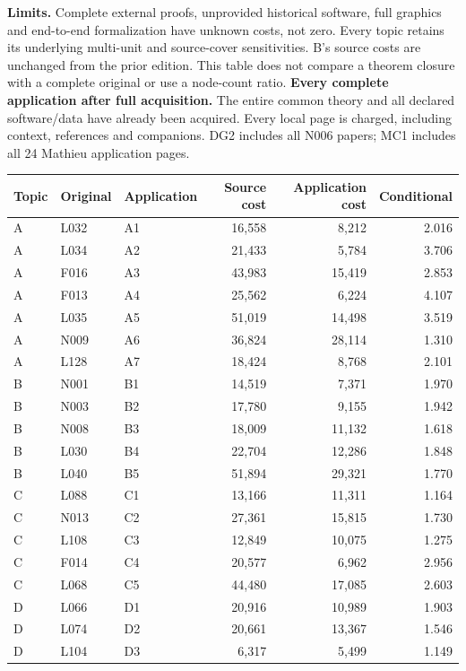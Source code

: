 \documentclass[11pt,a4paper]{article}
\newcommand{\tabsetup}{\small\setlength{\tabcolsep}{4pt}\renewcommand{\arraystretch}{1.10}}
\begin{document}
\textbf{Limits.} Complete external proofs, unprovided historical software, full graphics and end-to-end formalization have unknown costs, not zero. Every topic retains its underlying multi-unit and source-cover sensitivities. B's source costs are unchanged from the prior edition. This table does not compare a theorem closure with a complete original or use a node-count ratio.
\newpage
\textbf{Every complete application after full acquisition.}
The entire common theory and all declared software/data have already been acquired. Every local page is charged, including context, references and companions. DG2 includes all N006 papers; MC1 includes all 24 Mathieu application pages.
\begin{center}\tabsetup\renewcommand{\arraystretch}{1.03}\begin{tabular}{lllrrr}\toprule
Topic & Original & Application & Source cost & Application cost & Conditional\\\midrule
A & L032 & A1 & 16,558 & 8,212 & 2.016 \\
A & L034 & A2 & 21,433 & 5,784 & 3.706 \\
A & F016 & A3 & 43,983 & 15,419 & 2.853 \\
A & F013 & A4 & 25,562 & 6,224 & 4.107 \\
A & L035 & A5 & 51,019 & 14,498 & 3.519 \\
A & N009 & A6 & 36,824 & 28,114 & 1.310 \\
A & L128 & A7 & 18,424 & 8,768 & 2.101 \\
B & N001 & B1 & 14,519 & 7,371 & 1.970 \\
B & N003 & B2 & 17,780 & 9,155 & 1.942 \\
B & N008 & B3 & 18,009 & 11,132 & 1.618 \\
B & L030 & B4 & 22,704 & 12,286 & 1.848 \\
B & L040 & B5 & 51,894 & 29,321 & 1.770 \\
C & L088 & C1 & 13,166 & 11,311 & 1.164 \\
C & N013 & C2 & 27,361 & 15,815 & 1.730 \\
C & L108 & C3 & 12,849 & 10,075 & 1.275 \\
C & F014 & C4 & 20,577 & 6,962 & 2.956 \\
C & L068 & C5 & 44,480 & 17,085 & 2.603 \\
D & L066 & D1 & 20,916 & 10,989 & 1.903 \\
D & L074 & D2 & 20,661 & 13,367 & 1.546 \\
D & L104 & D3 & 6,317 & 5,499 & 1.149 \\

\end{tabular}
\end{center}
\end{document}
